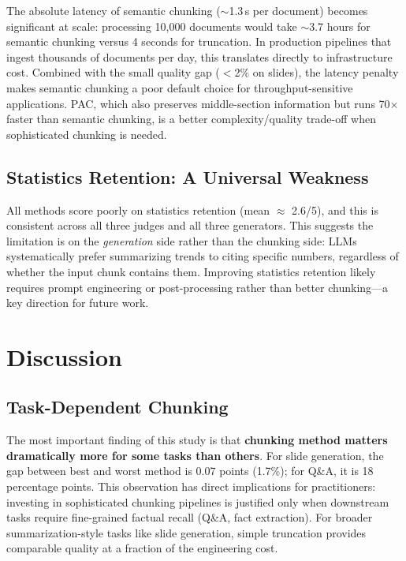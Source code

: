 \documentclass[journal]{IEEEtran}
\begin{document}
The absolute latency of semantic chunking ($\sim$1.3\,s per document) becomes significant at scale: processing 10{,}000 documents would take $\sim$3.7 hours for semantic chunking versus 4 seconds for truncation. In production pipelines that ingest thousands of documents per day, this translates directly to infrastructure cost. Combined with the small quality gap ($<$2\% on slides), the latency penalty makes semantic chunking a poor default choice for throughput-sensitive applications. PAC, which also preserves middle-section information but runs 70$\times$ faster than semantic chunking, is a better complexity/quality trade-off when sophisticated chunking is needed.

\subsection{Statistics Retention: A Universal Weakness}

All methods score poorly on statistics retention (mean $\approx$ 2.6/5), and this is consistent across all three judges and all three generators. This suggests the limitation is on the \textit{generation} side rather than the chunking side: LLMs systematically prefer summarizing trends to citing specific numbers, regardless of whether the input chunk contains them. Improving statistics retention likely requires prompt engineering or post-processing rather than better chunking---a key direction for future work.

\section{Discussion}

\subsection{Task-Dependent Chunking}

The most important finding of this study is that \textbf{chunking method matters dramatically more for some tasks than others}. For slide generation, the gap between best and worst method is 0.07 points (1.7\%); for Q\&A, it is 18 percentage points. This observation has direct implications for practitioners: investing in sophisticated chunking pipelines is justified only when downstream tasks require fine-grained factual recall (Q\&A, fact extraction). For broader summarization-style tasks like slide generation, simple truncation provides comparable quality at a fraction of the engineering cost.
\end{document}
